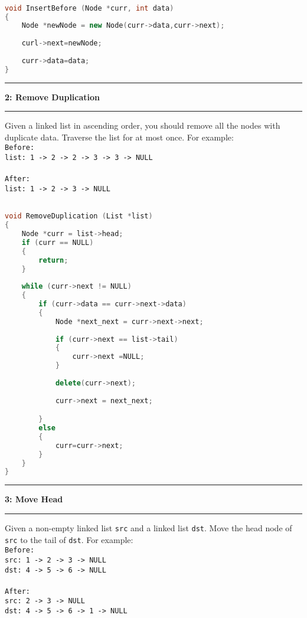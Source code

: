 \documentclass[10.5pt]{article}
\newcommand\question[2]{\vspace{.25in}\hrule\textbf{#1: #2}\vspace{.5em}\hrule\vspace{.10in}}
\begin{document}
\hrulefill
\begin{lstlisting}[language=C++]

void InsertBefore (Node *curr, int data)
{
    Node *newNode = new Node(curr->data,curr->next);
    
    curl->next=newNode;
    
    curr->data=data;
}

\end{lstlisting}

\pagebreak

\question{2}{Remove Duplication}
Given a linked list in ascending order, you should remove all the nodes with duplicate data. Traverse the list for at most once. For example: \\

\texttt{Before:}\\
\texttt{list: 1 -> 2 -> 2 -> 3 -> 3 -> NULL}\\
\\
\texttt{After:}\\
\texttt{list: 1 -> 2 -> 3 -> NULL}\\


\hrulefill
\begin{lstlisting}[language=C++]

void RemoveDuplication (List *list)
{
    Node *curr = list->head;
    if (curr == NULL) 
    {
        return;
    }
	
    while (curr->next != NULL)
    {
        if (curr->data == curr->next->data)
        {
            Node *next_next = curr->next->next;
                        
            if (curr->next == list->tail)
            {
                curr->next =NULL;
            }
            
            delete(curr->next);
            
            curr->next = next_next;

        }
        else
        {
            curr=curr->next;
        }
    }
}
\end{lstlisting}
\pagebreak


\question{3}{Move Head}
Given a non-empty linked list \texttt{src} and a linked list \texttt{dst}. Move the head node of \texttt{src} to the tail of \texttt{dst}. For example: \\

\texttt{Before:}\\
\texttt{src: 1 -> 2 -> 3 -> NULL}\\
\texttt{dst: 4 -> 5 -> 6 -> NULL}\\
\\
\texttt{After:}\\
\texttt{src: 2 -> 3 -> NULL}\\
\texttt{dst: 4 -> 5 -> 6 -> 1 -> NULL}\\
\end{document}
